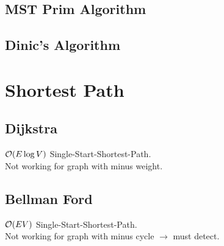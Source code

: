 \documentclass[landscape,8pt]{article}
\begin{document}
\begin{multicols}{2}
  \subsection{MST Prim Algorithm}
    


  \subsection{Dinic's Algorithm}
    



\columnbreak

\section{Shortest Path}
  \subsection{Dijkstra}
    $\order{E \log V}$ Single-Start-Shortest-Path.\\
    Not working for graph with minus weight.
      

  \subsection{Bellman Ford}
    $\order{EV}$ Single-Start-Shortest-Path.\\
    Not working for graph with minus cycle $\rightarrow$ must detect.
      


\end{multicols}
\end{document}
